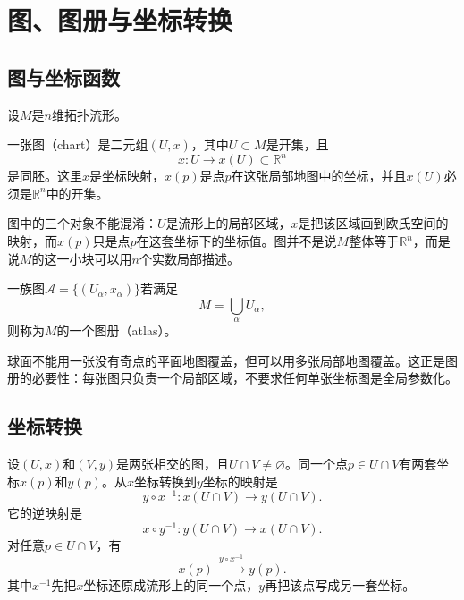 \section{图、图册与坐标转换}

\subsection{图与坐标函数}

设$M$是$n$维拓扑流形。

\begin{definition}[图]
一张图（chart）是二元组$(U,x)$，其中$U\subset M$是开集，且
\[
    x:U\to x(U)\subset\mathbb R^n
\]
是同胚。这里$x$是坐标映射，$x(p)$是点$p$在这张局部地图中的坐标，并且$x(U)$必须是$\mathbb R^n$中的开集。
\end{definition}

图中的三个对象不能混淆：$U$是流形上的局部区域，$x$是把该区域画到欧氏空间的映射，而$x(p)$只是点$p$在这套坐标下的坐标值。图并不是说$M$整体等于$\mathbb R^n$，而是说$M$的这一小块可以用$n$个实数局部描述。

\begin{definition}[图册]
一族图$\mathcal A=\{(U_\alpha,x_\alpha)\}$若满足
\[
    M=\bigcup_\alpha U_\alpha,
\]
则称为$M$的一个图册（atlas）。
\end{definition}

球面不能用一张没有奇点的平面地图覆盖，但可以用多张局部地图覆盖。这正是图册的必要性：每张图只负责一个局部区域，不要求任何单张坐标图是全局参数化。

\subsection{坐标转换}

设$(U,x)$和$(V,y)$是两张相交的图，且$U\cap V\neq\varnothing$。同一个点$p\in U\cap V$有两套坐标$x(p)$和$y(p)$。从$x$坐标转换到$y$坐标的映射是
\[
    y\circ x^{-1}:
    x(U\cap V)\to y(U\cap V).
\]
它的逆映射是
\[
    x\circ y^{-1}:y(U\cap V)\to x(U\cap V).
\]
对任意$p\in U\cap V$，有
\[
    x(p)\xrightarrow{\ y\circ x^{-1}\ }y(p).
\]
其中$x^{-1}$先把$x$坐标还原成流形上的同一个点，$y$再把该点写成另一套坐标。

\begin{center}
\end{center}

